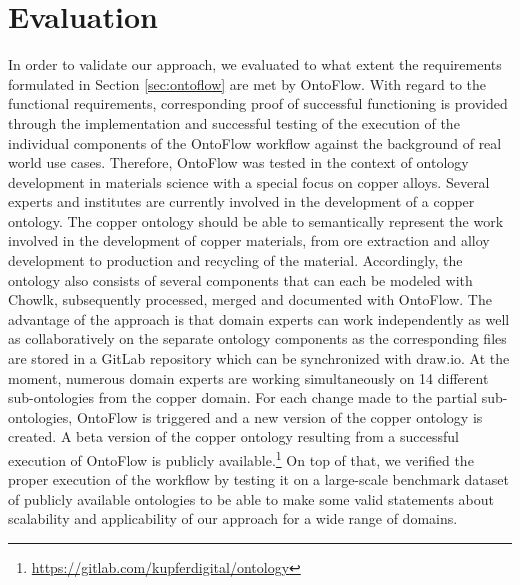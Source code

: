 \documentclass[runningheads]{llncs}
\begin{document}
\section{Evaluation}
\label{sec:eval}
In order to validate our approach, we evaluated to what extent the requirements formulated in Section \ref{sec:ontoflow} are met by OntoFlow. With regard to the functional requirements, corresponding proof of successful functioning is provided through the implementation and successful testing of the execution of the individual components of the OntoFlow workflow against the background of real world use cases. Therefore, OntoFlow was tested in the context of ontology development in materials science with a special focus on copper alloys. Several experts and institutes are currently involved in the development of a copper ontology. The copper ontology should be able to semantically represent the work involved in the development of copper materials, from ore extraction and alloy development to production and recycling of the material. Accordingly, the ontology also consists of several components that can each be modeled with Chowlk, subsequently processed, merged and documented with OntoFlow. The advantage of the approach is that domain experts can work independently as well as collaboratively on the separate ontology components as the corresponding files are stored in a GitLab repository which can be synchronized with draw.io. At the moment, numerous domain experts are working simultaneously on 14 different sub-ontologies from the copper domain. For each change made to the partial sub-ontologies, OntoFlow is triggered and a new version of the copper ontology is created. A beta version of the copper ontology resulting from a successful execution of OntoFlow is publicly available.\footnote{\url{https://gitlab.com/kupferdigital/ontology}}
On top of that, we verified the proper execution of the workflow by testing it on a large-scale benchmark dataset of publicly available ontologies to be able to make some valid statements about scalability and applicability of our approach for a wide range of domains.
\end{document}
